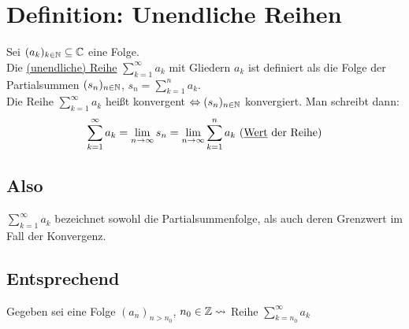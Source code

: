 \section{Definition: Unendliche Reihen}\label{7.1}
Sei $(a_k)_{k \in \mathbb{N}} \subseteq \mathbb{C}$ eine Folge.\\
Die \underline{(unendliche) Reihe} $\sum_{k=1}^\infty a_k$ mit Gliedern $a_k$ ist definiert als die Folge der Partialsummen $(s_n)_{n \in \mathbb{N}}$, $s_n = \sum_{k=1}^n a_k$.\\
Die Reihe $\sum_{k=1}^\infty a_k$ heißt konvergent $\Leftrightarrow (s_n)_{n \in \mathbb{N}}$ konvergiert.\nl
Man schreibt dann:
$$\sum_{k=1}^\infty a_k = \lim_{n \to \infty} s_n = \lim_{n \to \infty} \sum_{k=1}^n a_k \text{ (\underline{Wert} der Reihe)}$$

\subsection*{Also}
$\sum_{k=1}^\infty a_k$ bezeichnet sowohl die Partialsummenfolge, als auch deren Grenzwert im Fall der Konvergenz.

\subsection*{Entsprechend}
Gegeben sei eine Folge $(a_n)_{n > n_0}$, $n_0 \in \mathbb{Z} \rightsquigarrow$ Reihe $\sum_{k=n_0}^\infty a_k$

